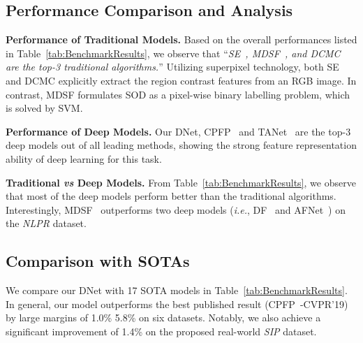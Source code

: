 \documentclass[journal]{IEEEtran}
\def\ie{\emph{i.e.}}
\newcommand{\tabref}[1]{Table~\ref{#1}}
\newcommand{\fdp}[1]{#1}
\begin{document}
\subsection{Performance Comparison and Analysis}\label{sec:PerformanceComparision}
\textbf{Performance of Traditional Models.}
Based on the overall performance\fdp{s} listed in \tabref{tab:BenchmarkResults},
we observe that ``\emph{SE~\cite{guo2016salient}, MDSF~\cite{song2017depth},
and DCMC~\cite{cong2016saliency} are \fdp{the top-3} traditional algorithms.}''
Utilizing superpixel technology, both SE and DCMC explicitly extract the
region contrast features from \fdp{an} RGB image. In contrast, MDSF formulate\fdp{s} SOD
as a pixel-wise binary labelling problem, which is solved by SVM.

\textbf{Performance of Deep Models.}
\fdp{Our} DNet, CPFP~\cite{zhao2019Contrast}
and TANet~\cite{chen2019three} are \fdp{the top-3}
deep models \fdp{out of all} leading methods,
showing the strong feature representation ability
of deep learning for this task.


\textbf{Traditional \emph{vs} Deep Models.}
From \tabref{tab:BenchmarkResults}, we observe that most of the deep models perform
better than the traditional algorithms. Interestingly, MDSF~\cite{zhu2017three}
outperforms two deep models (\ie, DF~\cite{qu2017rgbd} and AFNet~\cite{wang2019adaptive})
on \fdp{the} \emph{NLPR} dataset.




\subsection{Comparison with SOTAs}\label{sec:SOTAComparison}
We compare our DNet \fdp{with}
17 SOTA models in \tabref{tab:BenchmarkResults}.
In general, our model outperforms the best published result (CPFP~\cite{zhao2019Contrast}-CVPR'19)
by large margin\fdp{s} of 1.0\%  5.8\% on \fdp{six} datasets.
Notably, we \fdp{also} achieve \fdp{a} significant improvement of 1.4\% on
the proposed real-world \emph{SIP} dataset.
\end{document}
